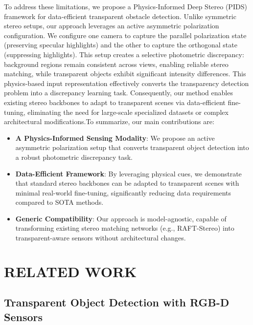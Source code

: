 \documentclass[letterpaper, 10 pt, conference]{ieeeconf}  %
\begin{document}
To address these limitations, we propose a Physics-Informed Deep Stereo (PIDS) framework for data-efficient transparent obstacle detection. Unlike symmetric stereo setups, our approach leverages an active asymmetric polarization configuration. We configure one camera to capture the parallel polarization state (preserving specular highlights) and the other to capture the orthogonal state (suppressing highlights). This setup creates a selective photometric discrepancy: background regions remain consistent across views, enabling reliable stereo matching, while transparent objects exhibit significant intensity differences. This physics-based input representation effectively converts the transparency detection problem into a discrepancy learning task. Consequently, our method enables existing stereo backbones to adapt to transparent scenes via data-efficient fine-tuning, eliminating the need for large-scale specialized datasets or complex architectural modifications.To summarize, our main contributions are:
\begin{itemize}
    \small
    \item \textbf{A Physics-Informed Sensing Modality}: We propose an active asymmetric polarization setup that converts transparent object detection into a robust photometric discrepancy task.
    \item \textbf{Data-Efficient Framework}: By leveraging physical cues, we demonstrate that standard stereo backbones can be adapted to transparent scenes with minimal real-world fine-tuning, significantly reducing data requirements compared to SOTA methods.
    \item \textbf{Generic Compatibility}: Our approach is model-agnostic, capable of transforming existing stereo matching networks (e.g., RAFT-Stereo) into transparent-aware sensors without architectural changes.
\end{itemize}

\section{RELATED WORK}

\subsection{\textbf{Transparent Object Detection with RGB-D Sensors}}
\end{document}
